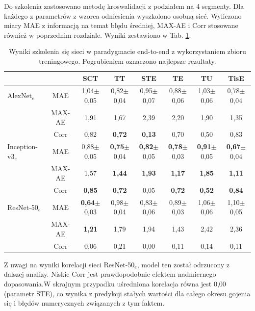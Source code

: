 Do szkolenia zastosowano metodę kroswalidacji z podziałem na 4 segmenty. Dla każdego z parametrów z wzorca odniesienia wyszkolono osobną sieć. Wyliczono miary MAE z informacją na temat błędu średniej, MAX-AE i Corr stosowane również w poprzednim rozdziale. Wyniki zestawiono w Tab. \ref{tab:end-to-endTrain}.
\vspace{10px}
\renewcommand{\arraystretch}{1.2}
\begin{table}[ht]
\scriptsize
\setlength{\tabcolsep}{1pt}
\centering
\caption{Wyniki szkolenia się sieci w paradygmacie end-to-end z wykorzystaniem zbioru treningowego. Pogrubieniem oznaczono najlepsze rezultaty.}
\label{tab:end-to-endTrain}
\begin{tabular}{lc||c|c|c|c|c|c}
	&& \textbf{SCT} & \textbf{TT} & \textbf{STE} & \textbf{TE} & \textbf{TU} & \textbf{TisE}\\ \hline \hline
	AlexNet$_{e}$ & MAE & 1,04$\pm$0,05 & 0,82$\pm$0,04 & 0,95$\pm$0,07 & 0,88$\pm$0,06 & 1,03$\pm$0,06 & 0,78$\pm$0,04  \\
	&MAX-AE & 1,91 & 1,67 & 2,39 & 2,20 & 1,90 & 1,35\\ 
	&Corr & 0,82 & \textbf{0,72} & \textbf{0,13} & 0,70 & 0,50 & 0,83 \\ \hline
	Inception-v3$_{e}$ & MAE & 0,88$\pm$0,05 & \textbf{0,75}$\pm$0,04 & \textbf{0,82}$\pm$0,05 & \textbf{0,78}$\pm$0,03 & \textbf{0,91}$\pm$0,05 & \textbf{0,67}$\pm$0,04 \\
	&MAX-AE & 1,57 & \textbf{1,44} & \textbf{1,93} & \textbf{1,17} & \textbf{1,85} & \textbf{1,11} \\ 
	&Corr & \textbf{0,85} & \textbf{0,72} & 0,05 & \textbf{0,72} & \textbf{0,52} & \textbf{0,84} \\ \hline
	ResNet-50$_{e}$ & MAE & \textbf{0,64}$\pm$0,03 & 0,98$\pm$0,04 & 0,83$\pm$0,06 & 0,89$\pm$0,03 & 1,06$\pm$0,06 & 1,10$\pm$0,05  \\
	&MAX-AE & \textbf{1,21} & 1,79 & 1,94 & 1,43 & 2,42 & 2,36\\
	&Corr & 0,06 & 0,21 & 0,00 & 0,11 & 0,14 & 0,11\\
	
	
\end{tabular}
\end{table}
\renewcommand{\arraystretch}{1}

Z uwagi na wyniki korelacji sieci ResNet-50$_{e}$, model ten został odrzucony z dalszej analizy. Niskie Corr jest prawdopodobnie efektem nadmiernego dopasowania.\linebreak W skrajnym przypadku uśredniona korelacja równa jest 0,00 (parametr STE), co wynika z predykcji stałych wartości dla całego okresu gojenia się i błędów numerycznych związanych z tym faktem. 

